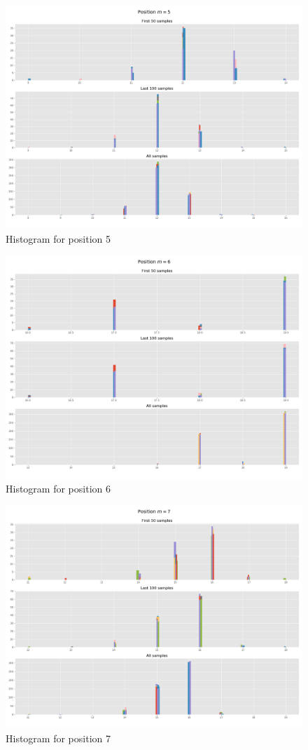 \documentclass[]{article}
\begin{document}
	\begin{figure}[H]
		\begin{center}
			
			\includegraphics[width=.5\textwidth]{task4/figures/T_2_4/Q2/distribution_pos5.png}
			\caption*{Histogram for position 5}
		\end{center}
	\end{figure}
	
	\begin{figure}[H]
		\begin{center}
			
			\includegraphics[width=.5\textwidth]{task4/figures/T_2_4/Q2/distribution_pos6.png}
			\caption*{Histogram for position 6}
		\end{center}
	\end{figure}
	
	\begin{figure}[H]
		\begin{center}
			
			\includegraphics[width=.5\textwidth]{task4/figures/T_2_4/Q2/distribution_pos7.png}
			\caption*{Histogram for position 7}
		\end{center}
	\end{figure}
	
\end{document}
